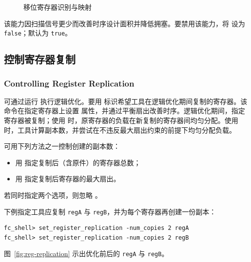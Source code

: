 \begin{figure}[htbp]
\centering
{}
\caption{移位寄存器识别与映射}
\label{fig:shift-reg}
\end{figure}

该能力因扫描信号更少而改善时序设计面积并降低拥塞。要禁用该能力，将  设为 \texttt{false}；默认为 \texttt{true}。

\subsection{控制寄存器复制}
\subsubsection*{Controlling Register Replication}

可通过运行  执行逻辑优化。要用  标识希望工具在逻辑优化期间复制的寄存器。该命令在指定寄存器上设置  属性，并通过平衡扇出改善时序。逻辑优化期间，指定寄存器被复制；使用  时，原寄存器的负载在新复制的寄存器间均匀分配。使用  时，工具计算副本数，并尝试在不违反最大扇出约束的前提下均匀分配负载。

可用下列方法之一控制创建的副本数：
\begin{itemize}
  \item 用  指定复制后（含原件）的寄存器总数；
  \item 用  指定复制后寄存器的最大扇出。
\end{itemize}

若同时指定两个选项，则忽略 。

下例指定工具应复制 \texttt{regA} 与 \texttt{regB}，并为每个寄存器再创建一份副本：
\begin{lstlisting}
fc_shell> set_register_replication -num_copies 2 regA
fc_shell> set_register_replication -num_copies 2 regB
\end{lstlisting}

图~\ref{fig:reg-replication} 示出优化前后的 \texttt{regA} 与 \texttt{regB}。

